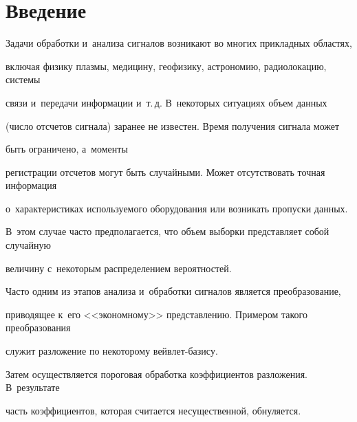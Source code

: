 









      \thispagestyle{headings}

      

      \vspace*{-18pt} 

  





\section{Введение}



\vspace*{-2pt}



Задачи обработки и~анализа сигналов возникают во многих прикладных областях, 

включая физику плазмы, медицину, геофизику, астрономию, радиолокацию, системы

 связи и~передачи информации и~т.\,д. В~некоторых ситуациях объем данных 

 (число отсчетов сигнала) заранее не известен. Время получения сигнала может 

 быть ограничено, а~моменты

регистрации отсчетов могут быть случайными. Может отсутствовать точная информация 

о~характеристиках используемого оборудования или возникать пропуски данных. 

В~этом случае часто предполагается, что объем выборки представляет собой случайную 

величину с~некоторым распределением вероятностей.



Часто одним из этапов анализа и~обработки сигналов является преобразование, 

приводящее к~его <<экономному>> представлению. Примером такого преобразования 

служит разложение по некоторому вейв\-лет-ба\-зи\-су. 

Затем осуществляется пороговая обработка коэффициентов разложения. В~результате

  часть коэффициентов, которая считается несущественной, обнуляется. 


